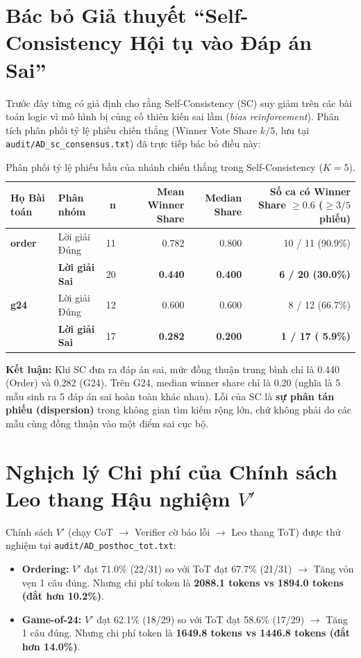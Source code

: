 \documentclass[11pt,a4paper]{report}
\begin{document}
\section{Bác bỏ Giả thuyết ``Self-Consistency Hội tụ vào Đáp án Sai''}
Trước đây từng có giả định cho rằng Self-Consistency (SC) suy giảm trên các bài toán logic vì mô hình bị củng cố thiên kiến sai lầm (\textit{bias reinforcement}). Phân tích phân phối tỷ lệ phiếu chiến thắng (Winner Vote Share $k/5$, lưu tại \texttt{audit/AD\_sc\_consensus.txt}) đã trực tiếp bác bỏ điều này:

\begin{table}[h!]
\centering\small
\begin{tabularx}{\textwidth}{llrrrr}
\toprule
\textbf{Họ Bài toán} & \textbf{Phân nhóm} & \textbf{n} & \textbf{Mean Winner Share} & \textbf{Median Share} & \textbf{Số ca có Winner Share $\ge 0.6$ ($\ge 3/5$ phiếu)} \\
\midrule
\textbf{order} & Lời giải Đúng & 11 & 0.782 & 0.800 & 10 / 11 (90.9\%) \\
& \textbf{Lời giải Sai} & 20 & \textbf{0.440} & \textbf{0.400} & \textbf{6 / 20 (30.0\%)} \\
\midrule
\textbf{g24} & Lời giải Đúng & 12 & 0.600 & 0.600 & 8 / 12 (66.7\%) \\
& \textbf{Lời giải Sai} & 17 & \textbf{0.282} & \textbf{0.200} & \textbf{1 / 17 ( 5.9\%)} \\
\bottomrule
\end{tabularx}
\caption{Phân phối tỷ lệ phiếu bầu của nhánh chiến thắng trong Self-Consistency ($K=5$).}
\end{table}

\textbf{Kết luận:} Khi SC đưa ra đáp án sai, mức đồng thuận trung bình chỉ là 0.440 (Order) và 0.282 (G24). Trên G24, median winner share chỉ là 0.20 (nghĩa là 5 mẫu sinh ra 5 đáp án sai hoàn toàn khác nhau). Lỗi của SC là \textbf{sự phân tán phiếu (dispersion)} trong không gian tìm kiếm rộng lớn, chứ không phải do các mẫu cùng đồng thuận vào một điểm sai cục bộ.

\section{Nghịch lý Chi phí của Chính sách Leo thang Hậu nghiệm $V'$}
Chính sách $V'$ (chạy CoT $\to$ Verifier cờ báo lỗi $\to$ Leo thang ToT) được thử nghiệm tại \texttt{audit/AD\_posthoc\_tot.txt}:
\begin{itemize}[leftmargin=*]
    \item \textbf{Ordering:} $V'$ đạt 71.0\% (22/31) so với ToT đạt 67.7\% (21/31) $\to$ Tăng vỏn vẹn 1 câu đúng. Nhưng chi phí token là \textbf{2088.1 tokens vs 1894.0 tokens (đắt hơn 10.2\%)}.
    \item \textbf{Game-of-24:} $V'$ đạt 62.1\% (18/29) so với ToT đạt 58.6\% (17/29) $\to$ Tăng 1 câu đúng. Nhưng chi phí token là \textbf{1649.8 tokens vs 1446.8 tokens (đắt hơn 14.0\%)}.
\end{itemize}
\end{document}
